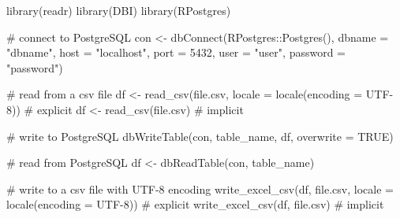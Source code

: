 \documentclass[
  letterpaper,
  DIV=11,
  numbers=noendperiod]{scrreprt}
\newenvironment{Shaded}{\begin{snugshade}}{\end{snugshade}}
\newcommand{\AttributeTok}[1]{\textcolor[rgb]{0.40,0.45,0.13}{#1}}
\newcommand{\CommentTok}[1]{\textcolor[rgb]{0.37,0.37,0.37}{#1}}
\newcommand{\ConstantTok}[1]{\textcolor[rgb]{0.56,0.35,0.01}{#1}}
\newcommand{\DecValTok}[1]{\textcolor[rgb]{0.68,0.00,0.00}{#1}}
\newcommand{\FunctionTok}[1]{\textcolor[rgb]{0.28,0.35,0.67}{#1}}
\newcommand{\NormalTok}[1]{\textcolor[rgb]{0.00,0.23,0.31}{#1}}
\newcommand{\OtherTok}[1]{\textcolor[rgb]{0.00,0.23,0.31}{#1}}
\newcommand{\SpecialCharTok}[1]{\textcolor[rgb]{0.37,0.37,0.37}{#1}}
\newcommand{\StringTok}[1]{\textcolor[rgb]{0.13,0.47,0.30}{#1}}
\begin{document}
\begin{itemize}
\begin{Shaded}
\begin{Highlighting}[]
\FunctionTok{library}\NormalTok{(readr)}
\FunctionTok{library}\NormalTok{(DBI)}
\FunctionTok{library}\NormalTok{(RPostgres)}

\CommentTok{\# connect to PostgreSQL}
\NormalTok{con }\OtherTok{\textless{}{-}} \FunctionTok{dbConnect}\NormalTok{(RPostgres}\SpecialCharTok{::}\FunctionTok{Postgres}\NormalTok{(), }\AttributeTok{dbname =} \StringTok{"dbname"}\NormalTok{, }\AttributeTok{host =} \StringTok{"localhost"}\NormalTok{, }\AttributeTok{port =} \DecValTok{5432}\NormalTok{, }\AttributeTok{user =} \StringTok{"user"}\NormalTok{, }\AttributeTok{password =} \StringTok{"password"}\NormalTok{)}

\CommentTok{\# read from a csv file}
\NormalTok{df }\OtherTok{\textless{}{-}} \FunctionTok{read\_csv}\NormalTok{(}\StringTok{\textquotesingle{}file.csv\textquotesingle{}}\NormalTok{, }\AttributeTok{locale =} \FunctionTok{locale}\NormalTok{(}\AttributeTok{encoding =} \StringTok{\textquotesingle{}UTF{-}8\textquotesingle{}}\NormalTok{))  }\CommentTok{\# explicit}
\NormalTok{df }\OtherTok{\textless{}{-}} \FunctionTok{read\_csv}\NormalTok{(}\StringTok{\textquotesingle{}file.csv\textquotesingle{}}\NormalTok{)                                       }\CommentTok{\# implicit}

\CommentTok{\# write to PostgreSQL}
\FunctionTok{dbWriteTable}\NormalTok{(con, }\StringTok{\textquotesingle{}table\_name\textquotesingle{}}\NormalTok{, df, }\AttributeTok{overwrite =} \ConstantTok{TRUE}\NormalTok{)}

\CommentTok{\# read from PostgreSQL}
\NormalTok{df }\OtherTok{\textless{}{-}} \FunctionTok{dbReadTable}\NormalTok{(con, }\StringTok{\textquotesingle{}table\_name\textquotesingle{}}\NormalTok{)}

\CommentTok{\# write to a csv file with UTF{-}8 encoding}
\FunctionTok{write\_excel\_csv}\NormalTok{(df, }\StringTok{\textquotesingle{}file.csv\textquotesingle{}}\NormalTok{, }\AttributeTok{locale =} \FunctionTok{locale}\NormalTok{(}\AttributeTok{encoding =} \StringTok{\textquotesingle{}UTF{-}8\textquotesingle{}}\NormalTok{))  }\CommentTok{\# explicit}
\FunctionTok{write\_excel\_csv}\NormalTok{(df, }\StringTok{\textquotesingle{}file.csv\textquotesingle{}}\NormalTok{)                                       }\CommentTok{\# implicit}
\end{Highlighting}
\end{Shaded}
\end{itemize}
\end{document}
